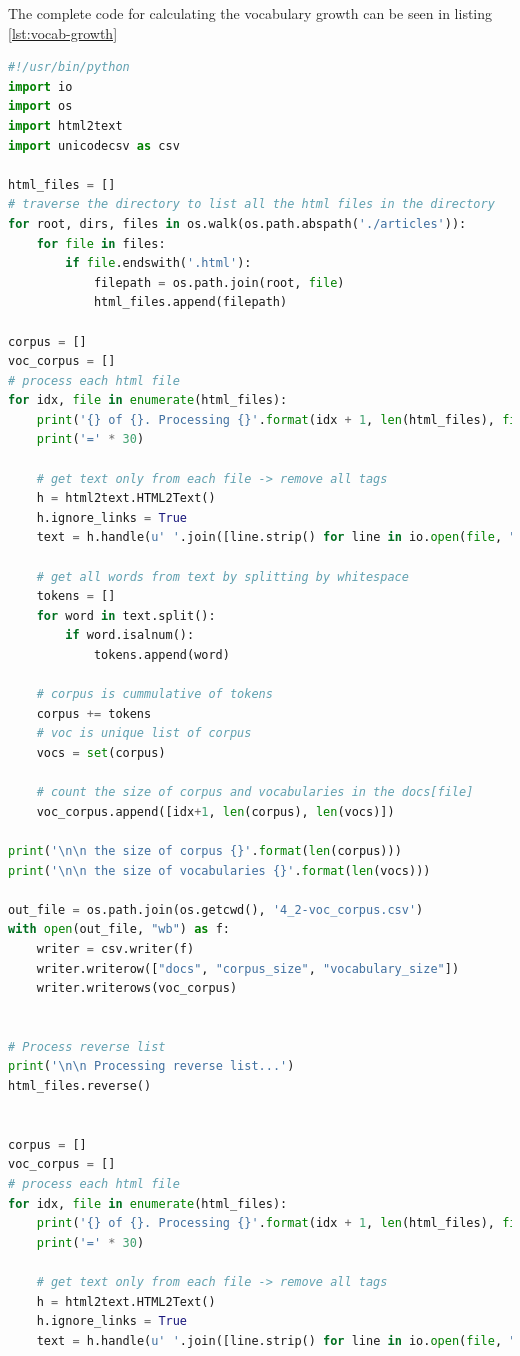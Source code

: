 \documentclass[letterpaper,11pt]{article}
\begin{document}
The complete code for calculating the vocabulary growth can be seen in listing \ref{lst:vocab-growth}

\begin{lstlisting}[language=python, caption={Source code for calculating vocabulary growth}, label={lst:vocab-growth}]
#!/usr/bin/python
import io
import os
import html2text
import unicodecsv as csv

html_files = []
# traverse the directory to list all the html files in the directory
for root, dirs, files in os.walk(os.path.abspath('./articles')):
    for file in files:
        if file.endswith('.html'):
            filepath = os.path.join(root, file)
            html_files.append(filepath)

corpus = []
voc_corpus = []
# process each html file
for idx, file in enumerate(html_files):
    print('{} of {}. Processing {}'.format(idx + 1, len(html_files), file))
    print('=' * 30)

    # get text only from each file -> remove all tags
    h = html2text.HTML2Text()
    h.ignore_links = True
    text = h.handle(u' '.join([line.strip() for line in io.open(file, "r", encoding="utf-8").readlines()]))

    # get all words from text by splitting by whitespace
    tokens = []
    for word in text.split():
        if word.isalnum():
            tokens.append(word)

    # corpus is cummulative of tokens
    corpus += tokens
    # voc is unique list of corpus
    vocs = set(corpus)

    # count the size of corpus and vocabularies in the docs[file]
    voc_corpus.append([idx+1, len(corpus), len(vocs)])

print('\n\n the size of corpus {}'.format(len(corpus)))
print('\n\n the size of vocabularies {}'.format(len(vocs)))

out_file = os.path.join(os.getcwd(), '4_2-voc_corpus.csv')
with open(out_file, "wb") as f:
    writer = csv.writer(f)
    writer.writerow(["docs", "corpus_size", "vocabulary_size"])
    writer.writerows(voc_corpus)


# Process reverse list
print('\n\n Processing reverse list...')
html_files.reverse()


corpus = []
voc_corpus = []
# process each html file
for idx, file in enumerate(html_files):
    print('{} of {}. Processing {}'.format(idx + 1, len(html_files), file))
    print('=' * 30)

    # get text only from each file -> remove all tags
    h = html2text.HTML2Text()
    h.ignore_links = True
    text = h.handle(u' '.join([line.strip() for line in io.open(file, "r", encoding="utf-8").readlines()]))


\end{lstlisting}
\end{document}
